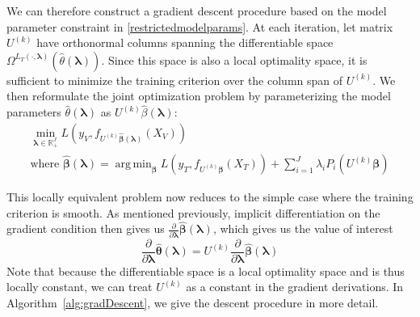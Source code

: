 \documentclass[10pt,letterpaper]{article}
\DeclareMathOperator*{\argmin}{arg\,min}
\begin{document}
We can therefore construct a gradient descent procedure based on the model parameter constraint in \eqref{restrictedmodelparams}. At each iteration, let matrix $U^{(k)}$ have orthonormal columns spanning the differentiable space $\Omega^{L_T(\cdot, \boldsymbol{\lambda})}(\hat \theta(\boldsymbol{\lambda}))$. Since this space is also a local optimality space, it is sufficient to minimize the training criterion over the column span of $U^{(k)}$. We then reformulate the joint optimization problem by parameterizing the model parameters $\hat \theta(\boldsymbol{\lambda})$ as $U^{(k)} \hat \beta(\boldsymbol{\lambda})$:
\begin{equation}
\begin{array}{c}
\min_{\boldsymbol \lambda \in \mathbb{R}_{+}^{J}} L(y_V, f_{U^{(k)} \hat{\boldsymbol \beta} (\boldsymbol \lambda) }(X_V)) \\
\text{where } \hat{\boldsymbol \beta} (\boldsymbol \lambda) =
\argmin_{\boldsymbol \beta}
L(y_T, f_{U^{(k)} \boldsymbol \beta}(X_T))
+ \sum\limits_{i=1}^J \lambda_i P_i( U^{(k)} \boldsymbol \beta)
\end{array}
\end{equation}

This locally equivalent problem now reduces to the simple case where the training criterion is smooth. As mentioned previously, implicit differentiation on the gradient condition then gives us $\frac{\partial}{\partial \boldsymbol \lambda}\hat{\boldsymbol \beta}(\boldsymbol \lambda)$, which gives us the value of interest
\begin{equation}
\frac{\partial}{\partial \boldsymbol \lambda}\hat{\boldsymbol \theta}(\boldsymbol \lambda) = U^{(k)} \frac{\partial}{\partial \boldsymbol \lambda}\hat{\boldsymbol \beta}(\boldsymbol \lambda)
\end{equation}
Note that because the differentiable space is a local optimality space and is thus locally constant, we can treat $U^{(k)}$ as a constant in the gradient derivations. In Algorithm~\ref{alg:gradDescent}, we give the descent procedure in more detail.
\end{document}
